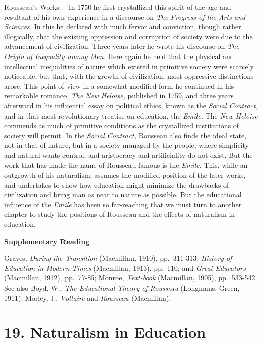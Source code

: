 \documentclass[
]{book}
\begin{document}
Rousseau's Works. - In 1750 he first crystallized this spirit of the age and resultant of his own experience in a discourse on \emph{The Progress of the Arts and Sciences.} In this he declared with much fervor and conviction, though rather illogically, that the existing oppression and corruption of society were due to the advancement of civilization. Three years later he wrote his discourse on \emph{The Origin of Inequality among Men.} Here again he held that the physical and intellectual inequalities of nature which existed in primitive society were scarcely noticeable, but that, with the growth of civilization, most oppressive distinctions arose. This point of view in a somewhat modified form he continued in his remarkable romance, \emph{The New Heloise,} published in 1759, and three years afterward in his influential essay on political ethics, known as the \emph{Social Contract,} and in that most revolutionary treatise on education, the \emph{Emile.} The \emph{New Heloise} commends as much of primitive conditions as the crystallized institutions of society will permit. In the \emph{Social Contract,} Rousseau also finds the ideal state, not in that of nature, but in a society managed by the people, where simplicity and natural wants control, and aristocracy and artificiality do not exist. But the work that has made the name of Rousseau famous is the \emph{Emile.} This, while an outgrowth of his naturalism, assumes the modified position of the later works, and undertakes to show how education might minimize the drawbacks of civilization and bring man as near to nature as possible. But the educational influence of the \emph{Emile} has been so far-reaching that we must turn to another chapter to study the positions of Rousseau and the effects of naturalism in education.

\textbf{Supplementary Reading}

Graves, \emph{During the Transition} (Macmillan, 1910), pp.~311-313; \emph{History of Education in Modern Times} (Macmillan, 1913), pp.~110; and \emph{Great Educators} (Macmillan, 1912), pp.~77-85; Monroe, \emph{Text-book} (Macmillan, 1905), pp.~533-542. See also Boyd, W., \emph{The Educational Theory of Rousseau} (Longmans, Green, 1911); Morley, J., \emph{Voltaire} and \emph{Rousseau} (Macmillan).

\hypertarget{naturalism-in-education}{%
\chapter{19. Naturalism in Education}\label{naturalism-in-education}}
\end{document}

